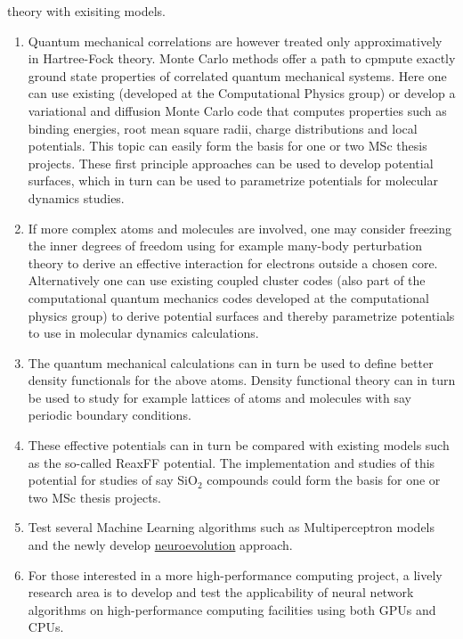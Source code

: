 \documentclass[%
oneside,                 %
final,                   %
10pt]{article}
\begin{document}
\noindent
theory with exisiting models.
\begin{enumerate}
\item Quantum mechanical correlations are however treated only approximatively in Hartree-Fock theory. Monte Carlo methods offer a path to cpmpute exactly ground state properties of correlated quantum mechanical systems. Here one can use existing (developed at the Computational Physics group) or develop a variational and diffusion Monte Carlo code that computes properties such as binding energies, root mean square radii, charge distributions and local potentials.  This topic can easily form the basis for one or two MSc thesis projects. These first principle approaches can be used to develop potential surfaces, which in turn can be used to parametrize potentials for molecular dynamics studies.  

\item If more complex atoms and molecules are involved, one may consider freezing the inner degrees of freedom using for example many-body perturbation theory to derive an effective interaction for electrons outside a chosen core. Alternatively one can use existing coupled cluster codes (also part of the computational quantum mechanics codes developed at the computational physics group) to derive potential surfaces and thereby parametrize potentials to use in molecular dynamics calculations.  

\item The quantum mechanical calculations can in turn be used to define better density functionals for the above atoms. Density functional theory can in turn be used to study for example lattices of atoms and molecules with say periodic boundary conditions.  

\item These effective potentials can in turn be compared with existing models such as the so-called ReaxFF potential. The implementation and studies of this potential for studies of say SiO$_2$ compounds could form the basis for one or two MSc thesis projects. 

\item Test several Machine Learning algorithms such as Multiperceptron models and the newly develop \href{{https://www.oreilly.com/ideas/neuroevolution-a-different-kind-of-deep-learning}}{neuroevolution} approach. 

\item For those interested in a more high-performance computing project, a lively research area is to develop and test the applicability of neural network algorithms on high-performance computing facilities using both GPUs and CPUs. 
\end{enumerate}
\end{document}
